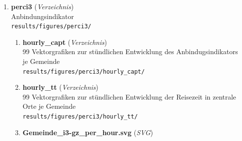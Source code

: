 \begin{enumerate}[label=A\arabic*, ref=A\arabic*, leftmargin=*, itemsep=0.5em, topsep=0.3em]
\begin{enumerate}[label=A\arabic{enumi}-\arabic*, ref=A\arabic{enumi}-\arabic*, leftmargin=*, itemsep=0.5em, topsep=0.3em]
\begin{enumerate}[label=A\arabic{enumi}-\arabic{enumii}-\arabic*, ref=A\arabic{enumi}-\arabic{enumii}-\arabic*, leftmargin=*, itemsep=0.5em, topsep=0.3em]
\begin{enumerate}[label=A\arabic{enumi}-\arabic{enumii}-\arabic{enumiii}-\arabic*, ref=A\arabic{enumi}-\arabic{enumii}-\arabic{enumiii}-\arabic*, leftmargin=*, itemsep=0.5em, topsep=0.3em]
99 Vektorgrafiken zur Entwicklung des Stunden-50\%-Quantils der Erschließungsqualität im Untersuchungszeitraum je Gemeinde\\
\texttt{\small results/figures/perceq/hourly/}
\edef\appendixlabelkey{app:A\arabic{enumi}-\arabic{enumii}-\arabic{enumiii}-\arabic{enumiv}}
\expandafter\label\expandafter{\appendixlabelkey}
\item \textbf{Gemeinde\_eq\_per\_hour.svg} \textnormal{(\textit{SVG})}\\
Übersichtsgrafik zur Entwicklung des Stunden-50\%-Quantils der Erschließungsqualität der Gemeinden\\
\texttt{\small results/figures/perceq/Gemeinde\_eq\_per\_hour.svg}
\edef\appendixlabelkey{app:A\arabic{enumi}-\arabic{enumii}-\arabic{enumiii}-\arabic{enumiv}}
\expandafter\label\expandafter{\appendixlabelkey}
\end{enumerate}
\item \textbf{perci3} \textnormal{(\textit{Verzeichnis})}\\
Anbindungsindikator\\
\texttt{\small results/figures/perci3/}
\edef\appendixlabelkey{app:A\arabic{enumi}-\arabic{enumii}-\arabic{enumiii}}
\expandafter\label\expandafter{\appendixlabelkey}
\begin{enumerate}[label=A\arabic{enumi}-\arabic{enumii}-\arabic{enumiii}-\arabic*, ref=A\arabic{enumi}-\arabic{enumii}-\arabic{enumiii}-\arabic*, leftmargin=*, itemsep=0.5em, topsep=0.3em]
\item \textbf{hourly\_capt} \textnormal{(\textit{Verzeichnis})}\\
99 Vektorgrafiken zur stündlichen Entwicklung des Anbindugsindikators je Gemeinde\\
\texttt{\small results/figures/perci3/hourly\_capt/}
\edef\appendixlabelkey{app:A\arabic{enumi}-\arabic{enumii}-\arabic{enumiii}-\arabic{enumiv}}
\expandafter\label\expandafter{\appendixlabelkey}
\item \textbf{hourly\_tt} \textnormal{(\textit{Verzeichnis})}\\
99 Vektorgrafiken zur stündlichen Entwicklung der Reisezeit in zentrale Orte je Gemeinde\\
\texttt{\small results/figures/perci3/hourly\_tt/}
\edef\appendixlabelkey{app:A\arabic{enumi}-\arabic{enumii}-\arabic{enumiii}-\arabic{enumiv}}
\expandafter\label\expandafter{\appendixlabelkey}
\item \textbf{Gemeinde\_i3-gz\_per\_hour.svg} \textnormal{(\textit{SVG})}\\

\end{enumerate}
\end{enumerate}
\end{enumerate}
\end{enumerate}
